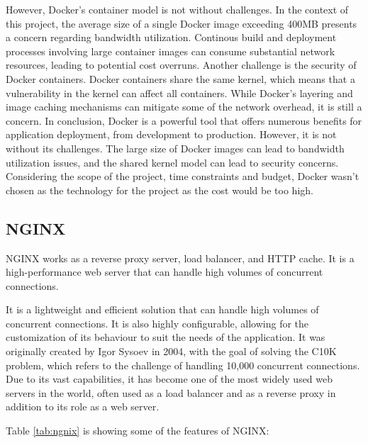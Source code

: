However, Docker's container model is not without challenges. In the context of this project, the average size of a single Docker image exceeding 400MB presents a concern regarding bandwidth utilization. Continous build and deployment processes involving large container images can consume substantial network resources, leading to potential cost overruns. \cite{merkel2014docker}
Another challenge is the security of Docker containers. Docker containers share the same kernel, which means that a vulnerability in the kernel can affect all containers. \cite{dockerhub}
While Docker's layering and image caching mechanisms can mitigate some of the network overhead, it is still a concern.
In conclusion, Docker is a powerful tool that offers numerous benefits for application deployment, from development to production. However, it is not without its challenges. The large size of Docker images can lead to bandwidth utilization issues, and the shared kernel model can lead to security concerns. Considering the scope of the project, time constraints and budget, Docker wasn't chosen as the technology for the project as the cost would be too high.


\subsection{NGINX}
NGINX works as a reverse proxy server, load balancer, and HTTP cache. It is a high-performance web server that can handle high volumes of concurrent connections. 

It is a lightweight and efficient solution that can handle high volumes of concurrent connections. It is also highly configurable, allowing for the customization of its behaviour to suit the needs of the application.
It was originally created by Igor Sysoev in 2004, with the goal of solving the C10K problem, which refers to the challenge of handling 10,000 concurrent connections. \cite{nginx} 
Due to its vast capabilities, it has become one of the most widely used web servers in the world, often used as a load balancer and as a reverse proxy in addition to its role as a web server.

Table \ref{tab:ngnix} is showing some of the features of NGINX\cite{nginx}:

